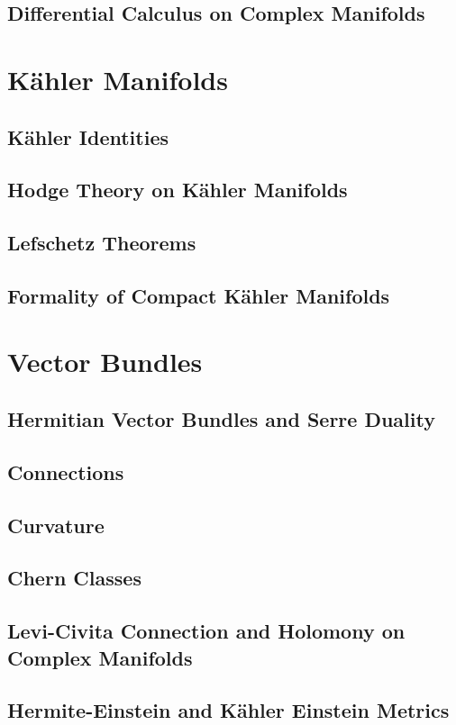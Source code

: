 \documentclass[oneside]{amsbook}
\renewcommand{\thesection}{\thechapter.\arabic{section}}
\numberwithin{ex}{section}
\begin{document}
\section{Differential Calculus on Complex Manifolds}


\chapter{Kähler Manifolds}
\section{Kähler Identities}

\section{Hodge Theory on Kähler Manifolds}

\section{Lefschetz Theorems}
\begin{subappendices}
\renewcommand{\thesection}{\Alph{section}}
\section{Formality of Compact Kähler Manifolds}

\end{subappendices}

\chapter{Vector Bundles}
\section{Hermitian Vector Bundles and Serre Duality}

\section{Connections}

\section{Curvature}

\section{Chern Classes}

\begin{subappendices}
\renewcommand{\thesection}{\Alph{section}}
\section{Levi-Civita Connection and Holomony on Complex Manifolds}

\section{Hermite-Einstein and Kähler Einstein Metrics}

\end{subappendices}
\end{document}
